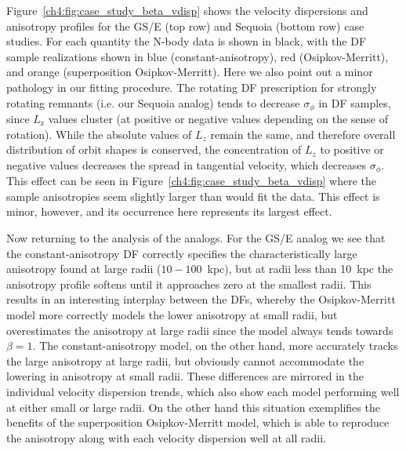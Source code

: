 Figure~\ref{ch4:fig:case_study_beta_vdisp} shows the velocity dispersions and anisotropy profiles for the GS/E (top row) and Sequoia (bottom row) case studies. For each quantity the N-body data is shown in black, with the DF sample realizations shown in blue (constant-anisotropy), red (Osipkov-Merritt), and orange (superposition Osipkov-Merritt). Here we also point out a minor pathology in our fitting procedure. The rotating DF prescription for strongly rotating remnants (i.e. our Sequoia analog) tends to decrease $\sigma_{\phi}$ in DF samples, since $L_\mathrm{z}$ values cluster (at positive or negative values depending on the sense of rotation). While the absolute values of $L_{z}$ remain the same, and therefore overall distribution of orbit shapes is conserved, the concentration of $L_{z}$ to positive or negative values decreases the spread in tangential velocity, which decreases $\sigma_{\phi}$. This effect can be seen in Figure~\ref{ch4:fig:case_study_beta_vdisp} where the sample anisotropies seem slightly larger than would fit the data. This effect is minor, however, and its occurrence here represents its largest effect.

Now returning to the analysis of the analogs. For the GS/E analog we see that the constant-anisotropy DF correctly specifies the characteristically large anisotropy found at large radii ($10-100$~kpc), but at radii less than 10~kpc the anisotropy profile softens until it approaches zero at the smallest radii. This results in an interesting interplay between the DFs, whereby the Osipkov-Merritt model more correctly models the lower anisotropy at small radii, but overestimates the anisotropy at large radii since the model always tends towards $\beta=1$. The constant-anisotropy model, on the other hand, more accurately tracks the large anisotropy at large radii, but obviously cannot accommodate the lowering in anisotropy at small radii. These differences are mirrored in the individual velocity dispersion trends, which also show each model performing well at either small or large radii. On the other hand this situation exemplifies the benefits of the superposition Osipkov-Merritt model, which is able to reproduce the anisotropy along with each velocity dispersion well at all radii.

